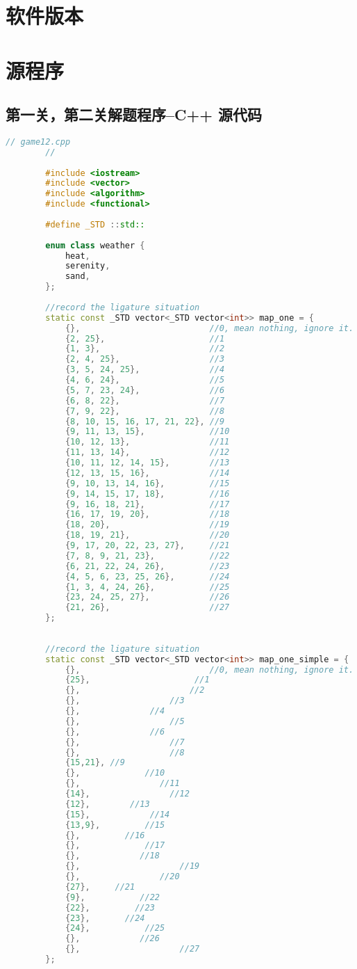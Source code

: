 \documentclass{cumcmthesis}
\begin{document}
\newpage
\begin{appendices}
	\section{软件版本}

	\section{源程序}
	\subsection*{第一关，第二关解题程序--C++ 源代码}
	\begin{lstlisting}[language=c++]
		// game12.cpp
		//
		
		#include <iostream>
		#include <vector>
		#include <algorithm>
		#include <functional>
		
		#define _STD ::std::
		
		enum class weather {
			heat,
			serenity,
			sand,
		};
		
		//record the ligature situation
		static const _STD vector<_STD vector<int>> map_one = {
			{},                          //0, mean nothing, ignore it.
			{2, 25},                     //1
			{1, 3},                      //2
			{2, 4, 25},                  //3
			{3, 5, 24, 25},              //4
			{4, 6, 24},                  //5
			{5, 7, 23, 24},              //6
			{6, 8, 22},                  //7
			{7, 9, 22},                  //8
			{8, 10, 15, 16, 17, 21, 22}, //9
			{9, 11, 13, 15},             //10
			{10, 12, 13},                //11
			{11, 13, 14},                //12
			{10, 11, 12, 14, 15},        //13
			{12, 13, 15, 16},            //14
			{9, 10, 13, 14, 16},         //15
			{9, 14, 15, 17, 18},         //16
			{9, 16, 18, 21},             //17
			{16, 17, 19, 20},            //18
			{18, 20},                    //19
			{18, 19, 21},                //20
			{9, 17, 20, 22, 23, 27},     //21
			{7, 8, 9, 21, 23},           //22
			{6, 21, 22, 24, 26},         //23
			{4, 5, 6, 23, 25, 26},       //24
			{1, 3, 4, 24, 26},           //25
			{23, 24, 25, 27},            //26
			{21, 26},                    //27
		};
		
		
		//record the ligature situation
		static const _STD vector<_STD vector<int>> map_one_simple = {
			{},                          //0, mean nothing, ignore it.
			{25},                     //1
			{},                      //2
			{},                  //3
			{},              //4
			{},                  //5
			{},              //6
			{},                  //7
			{},                  //8
			{15,21}, //9
			{},             //10
			{},                //11
			{14},                //12
			{12},        //13
			{15},            //14
			{13,9},         //15
			{},         //16
			{},             //17
			{},            //18
			{},                    //19
			{},                //20
			{27},     //21
			{9},           //22
			{22},         //23
			{23},       //24
			{24},           //25
			{},            //26
			{},                    //27
		};
		

\end{lstlisting}
\end{appendices}
\end{document}
